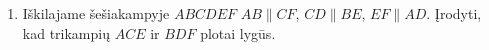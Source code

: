 \begin{enumerate}
\item Iškilajame šešiakampyje $ABCDEF$ $AB\parallel{CF}$,
  $CD\parallel{BE}$, $EF\parallel{AD}$. Įrodyti, kad
  trikampių $ACE$ ir $BDF$ plotai lygūs.

\end{enumerate}

